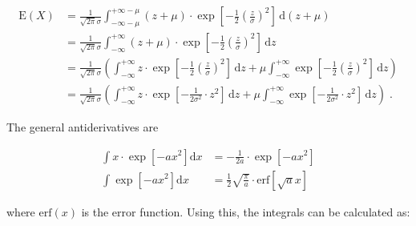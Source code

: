 \documentclass[a4paper,12pt]{book}
\begin{document}
\begin{equation} \label{eq:norm-mean-norm-mean-s2}
\begin{split}
\mathrm{E}(X) &= \frac{1}{\sqrt{2 \pi} \sigma} \int_{-\infty-\mu}^{+\infty-\mu} (z + \mu) \cdot \exp \left[ -\frac{1}{2} \left( \frac{z}{\sigma} \right)^2 \right] \, \mathrm{d}(z + \mu) \\
&= \frac{1}{\sqrt{2 \pi} \sigma} \int_{-\infty}^{+\infty} (z + \mu) \cdot \exp \left[ -\frac{1}{2} \left( \frac{z}{\sigma} \right)^2 \right] \, \mathrm{d}z \\
&= \frac{1}{\sqrt{2 \pi} \sigma} \left( \int_{-\infty}^{+\infty} z \cdot \exp \left[ -\frac{1}{2} \left( \frac{z}{\sigma} \right)^2 \right] \, \mathrm{d}z + \mu \int_{-\infty}^{+\infty} \exp \left[ -\frac{1}{2} \left( \frac{z}{\sigma} \right)^2 \right] \, \mathrm{d}z \right) \\
&= \frac{1}{\sqrt{2 \pi} \sigma} \left( \int_{-\infty}^{+\infty} z \cdot \exp \left[ -\frac{1}{2 \sigma^2} \cdot z^2 \right] \, \mathrm{d}z + \mu \int_{-\infty}^{+\infty} \exp \left[ -\frac{1}{2 \sigma^2} \cdot z^2 \right] \, \mathrm{d}z \right) \; .
\end{split}
\end{equation}

The general antiderivatives are

\begin{equation} \label{eq:norm-mean-exp-erf-anti-der}
\begin{split}
\int x \cdot \exp \left[ -a x^2 \right] \mathrm{d}x &= -\frac{1}{2a} \cdot \exp \left[ -a x^2 \right] \\
\int \exp \left[ -a x^2 \right] \mathrm{d}x &= \frac{1}{2} \sqrt{\frac{\pi}{a}} \cdot \mathrm{erf} \left[ \sqrt{a} x \right]
\end{split}
\end{equation}

where $\mathrm{erf}(x)$ is the error function. Using this, the integrals can be calculated as:
\end{document}
